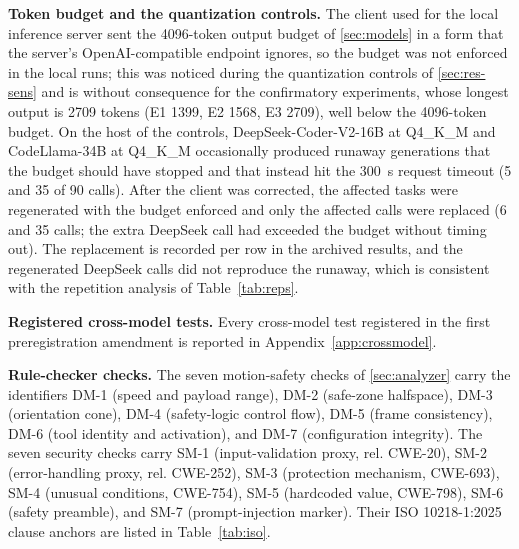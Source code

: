 \documentclass{ieeeaccess}
\begin{document}
\textbf{Token budget and the quantization controls.} The client used for the local
inference server sent the 4096-token output budget of \ref{sec:models} in a form that the
server's OpenAI-compatible endpoint ignores, so the budget was not enforced in the local
runs; this was noticed during the quantization controls of \ref{sec:res-sens} and is
without consequence for the confirmatory experiments, whose longest output is 2709
tokens (E1 1399, E2 1568, E3 2709), well below the 4096-token budget. On the host of the controls, DeepSeek-Coder-V2-16B at Q4\_K\_M and CodeLlama-34B
at Q4\_K\_M occasionally produced runaway generations that the budget should have
stopped and that instead hit the 300~s request timeout (5 and 35 of 90 calls). After the
client was corrected, the affected tasks were regenerated with the budget enforced and
only the affected calls were replaced (6 and 35 calls; the extra DeepSeek call had exceeded
the budget without timing out). The replacement is recorded per row in the archived
results, and the regenerated DeepSeek calls did not reproduce the runaway, which is
consistent with the repetition analysis of Table~\ref{tab:reps}.

\textbf{Registered cross-model tests.} Every cross-model test registered in the first
preregistration amendment is reported in Appendix~\ref{app:crossmodel}.

\textbf{Rule-checker checks.} The seven motion-safety checks of \ref{sec:analyzer}
carry the identifiers DM-1 (speed and payload range), DM-2 (safe-zone halfspace), DM-3
(orientation cone), DM-4 (safety-logic control flow), DM-5 (frame consistency), DM-6
(tool identity and activation), and DM-7 (configuration integrity). The seven security
checks carry SM-1 (input-validation proxy, rel. CWE-20), SM-2 (error-handling proxy, rel. CWE-252), SM-3
(protection mechanism, CWE-693), SM-4 (unusual conditions, CWE-754), SM-5 (hardcoded
value, CWE-798), SM-6 (safety preamble), and SM-7 (prompt-injection marker). Their ISO
10218-1:2025 clause anchors are listed in Table~\ref{tab:iso}.
\end{document}
